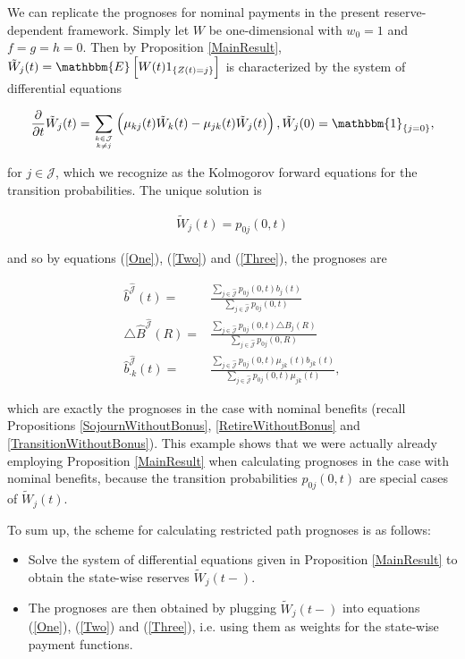 \documentclass{article}
\newcommand{\1}[1]{\mathbbm{1}_{\left\lbrace #1 \right\rbrace}}
\newcommand{\expec}[1][def]{\mathbbm{E} \left[ #1 \right]}
\theoremstyle{break}
\theoremstyle{remark}
\newenvironment{remark}
  {\pushQED{\qed}\renewcommand{\qedsymbol}{\scalebox{1.4}{$\circ$}}\remarkx}
  {\popQED\endremarkx}
\numberwithin{equation}{section}
\begin{document}
\begin{remark} \label{WithoutBonusAsSpecialCase}
	We can replicate the prognoses for nominal payments in the present reserve-dependent framework. Simply let $W$ be one-dimensional with $w_0=1$ and $f=g=h=0$. Then by Proposition \ref{MainResult}, $\tilde{W}_j(t)=\expec[W(t) 1_{\{Z(t)=j\}}]$ is characterized by the system of differential equations
	
	\begin{align*}
		\frac{\partial}{\partial t} \tilde{W}_j(t) = \sum_{k \in \mathcal{J} \atop k \neq j} \left( \mu_{kj}(t) \tilde{W}_k(t) - \mu_{jk}(t) \tilde{W}_j(t) \right), \tilde{W}_j(0) = \1{j=0},
	\end{align*}
	
	for $j \in \mathcal{J}$, which we recognize as the Kolmogorov forward equations for the transition probabilities. The unique solution is
	
	\begin{align*}
		\tilde{W}_j(t) = p_{0j}(0,t)
	\end{align*}
	
	and so by equations (\ref{One}), (\ref{Two}) and (\ref{Three}), the prognoses are
	
\begin{align*}
	\hat{b}^{\hat{\mathcal{J}}}(t) =& \frac{\sum_{j \in \hat{\mathcal{J}}} p_{0j}(0,t) b_j(t)}{\sum_{j \in \hat{\mathcal{J}}} p_{0j}(0,t)} \\
	\triangle \hat{B}^{\hat{\mathcal{J}}}(R) =& \frac{\sum_{j \in \hat{\mathcal{J}}} p_{0j}(0,t) \triangle B_j(R)}{\sum_{j \in \hat{\mathcal{J}}} p_{0j}(0,R)} \\
	\hat{b}_{\cdot k}^{\hat{\mathcal{J}}}(t) =& \frac{\sum_{j \in \hat{\mathcal{J}}} p_{0j}(0,t) \mu_{jk}(t) b_{jk}(t)}{\sum_{j \in \hat{\mathcal{J}}} p_{0j}(0,t) \mu_{jk}(t)},
\end{align*}
	
	which are exactly the prognoses in the case with nominal benefits (recall Propositions \ref{SojournWithoutBonus}, \ref{RetireWithoutBonus} and \ref{TransitionWithoutBonus}). This example shows that we were actually already employing Proposition \ref{MainResult} when calculating prognoses in the case with nominal benefits, because the transition probabilities $p_{0j}(0,t)$ are special cases of $\tilde{W}_j(t)$.
\end{remark}

To sum up, the scheme for calculating restricted path prognoses is as follows:

\begin{itemize}
	\item Solve the system of differential equations given in Proposition \ref{MainResult} to obtain the state-wise reserves $\tilde{W}_j(t-)$.
	\item The prognoses are then obtained by plugging $\tilde{W}_j(t-)$ into equations (\ref{One}), (\ref{Two}) and (\ref{Three}), i.e. using them as weights for the state-wise payment functions.
\end{itemize}
\end{document}
